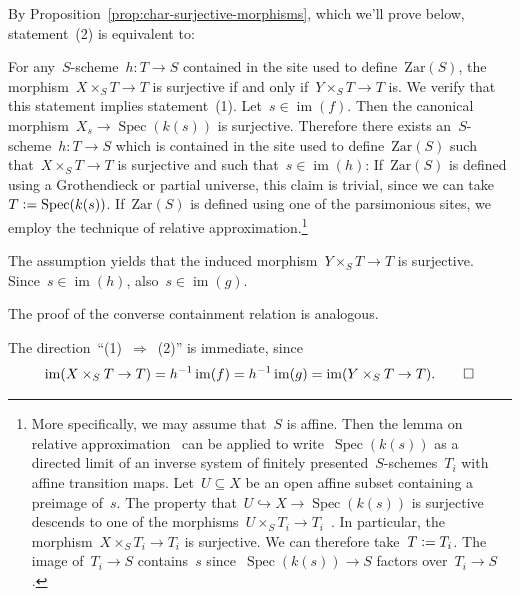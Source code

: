 \documentclass[10pt,reqno,a4paper]{amsbook}
\makeatletter
\theoremstyle{definition}
\theoremstyle{plain}
\theoremstyle{remark}
\newcommand{\Zar}{\mathrm{Zar}}
\DeclareMathOperator{\Spec}{Spec}
\DeclareMathOperator{\im}{im}
\newcommand{\?}{\,{:}\,}
\renewcommand{\_}{\mathpunct{.}\,}
\newcommand{\stacksproject}[1]{\cite[{\href{https://stacks.math.columbia.edu/tag/#1}{Tag~#1}}]{stacks-project}}
\newenvironment{indentblock}{%
  \list{}{\leftmargin\leftmargin}%
  \item\relax
}{%
  \endlist
}
\newcommand{\defeq}{\vcentcolon=}
\renewenvironment{proof}[1][\proofname]{\par
  \pushQED{\qed}%
  \normalfont \topsep6\p@\@plus6\p@\relax
  \trivlist
  \item[\hskip\labelsep
        \itshape
    #1\@addpunct{.}]\ignorespaces
}{%
  \popQED\endtrivlist\@endpefalse
}
\makeatother
\begin{document}
\begin{proof}By Proposition~\ref{prop:char-surjective-morphisms}, which we'll
prove below, statement~(2) is equivalent to:
\begin{indentblock}
For any~$S$-scheme~$h : T \to S$ contained in the site used to
define~$\Zar(S)$, the morphism~$X \times_S T \to T$ is surjective if and only
if~$Y \times_S T \to T$ is.
\end{indentblock}
We verify that this statement implies statement~(1). Let~$s \in \im(f)$. Then the canonical
morphism~$X_s \to \Spec(k(s))$ is surjective. Therefore there exists
an~$S$-scheme~$h : T \to S$ which is contained in the site used to
define~$\Zar(S)$ such that~$X \times_S T \to T$ is surjective and such that~$s
\in \im(h)$: If~$\Zar(S)$ is defined using a Grothendieck or partial universe,
this claim is trivial, since we can take~$T \defeq \Spec(k(s))$. If~$\Zar(S)$
is defined using one of the parsimonious sites, we employ the technique of
relative approximation.\footnote{More specifically, we may assume that~$S$ is
affine. Then the lemma on relative approximation~\stacksproject{09MV} can be
applied to write~$\Spec(k(s))$ as a directed limit of an inverse system of
finitely presented~$S$-schemes~$T_i$ with affine transition maps. Let~$U
\subseteq X$ be an open affine subset containing a preimage of~$s$. The
property that~$U \hookrightarrow X \to \Spec(k(s))$ is surjective descends to
one of the morphisms~$U \times_S T_i \to T_i$~\stacksproject{07RR}. In
particular, the morphism~$X \times_S T_i \to T_i$ is surjective. We can
therefore take~$T \defeq T_i$. The image of~$T_i \to S$ contains~$s$
since~$\Spec(k(s)) \to S$ factors over~$T_i \to S$.}

The assumption yields that the induced morphism~$Y \times_S T \to T$ is
surjective. Since~$s \in \im(h)$, also~$s \in \im(g)$.

The proof of the converse containment relation is analogous.

The direction~``(1)~$\Rightarrow$~(2)'' is immediate, since
\[ \im(X \times_S T \to T) = h^{-1} \im(f) = h^{-1} \im(g) = \im(Y \times_S T \to T).
  \qedhere \]
\end{proof}
\end{document}

